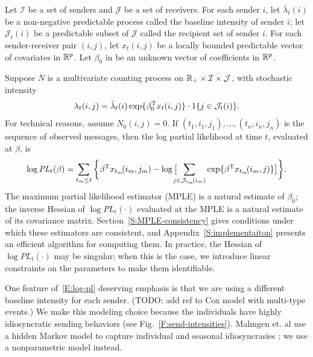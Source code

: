 \documentclass[aoas,preprint]{imsart}
\begin{document}
Let $\mathcal{I}$ be a set of senders and $\mathcal{J}$ be a set of receivers.
For each sender $i$, let $\bar \lambda_t(i)$ be a non-negative predictable
process called the baseline intensity of sender $i$; let
$\mathcal{J}_t(i)$ be a predictable subset of $\mathcal{J}$ called the 
recipient set of sender $i$.
For each sender-receiver pair $(i,j)$, let $x_t(i,j)$ be a locally bounded
predictable vector of covariates in $\mathbb{R}^p$.  Let $\beta_0$ in
be an unknown vector of coefficients in  $\mathbb{R}^p$.

Suppose $N$ is a multivariate counting process on 
$\mathbb{R}_+ \times \mathcal{I} \times \mathcal{J}$,
with stochastic intensity
\begin{equation}\label{E:cox-intensity}
    \lambda_t(i,j)
        =
        \bar \lambda_t(i)
        \exp\{ \beta_0^\trans x_t(i, j) \}
        \cdot
        1{\{j \in \mathcal{J}_t(i)\}}.
\end{equation}
For technical reasons, assume $N_0(i,j) = 0$.  If
$(t_1, i_1, j_1), \ldots, (t_n, i_n, j_n)$ is the sequence of observed
messages, then the log partial likelihood at time $t$, evaluated at $\beta$,
is
\begin{equation}\label{E:log-pl}
    \log
    \mathit{PL}_t(\beta)
        =
        \sum_{t_m \leq t}
        \bigg\{
            \beta^\trans x_{t_m}\!(i_m, j_m)
            -
            \log\big[
                \!\!\!\!
                \sum_{j \in \mathcal{J}_{t_m}\!(i_m)}
                    \exp\{ \beta^\trans x_{t_m}\!(i_m, j)\}
            \big]
        \bigg\}.
\end{equation}
The maximum partial likelihood estimator (MPLE) is a natural
estimate of $\beta_0$; the inverse Hessian of $\log \mathit{PL}_t(\cdot)$
evaluated at the MPLE is a natural estimate of its covariance matrix.
Section~\ref{S:MPLE-consistency} gives conditions under which these
estimators are consistent, and Appendix~\ref{S:implementaiton} presents
an efficient algorithm for computing them.  In practice, the
Hessian of $\log \mathit{PL}_t(\cdot)$ may be singular; when this is
the case, we introduce linear constraints on the parameters to make
them identifiable.

One feature of~\eqref{E:log-pl} deserving emphasis is that we are using
a different baseline intensity for each sender.  (TODO: add ref to
Cox model with multi-type events.)  We make this modeling
choice because the individuals have highly idiosyncratic sending behaviors
(see Fig.~\ref{F:send-intensities}).  Malmgen et. al use a hidden Markov
model to capture individual and seasonal idiosyncrasies
\cite{malmgen2009characterizing}; we use a nonparametric model instead.
\end{document}
